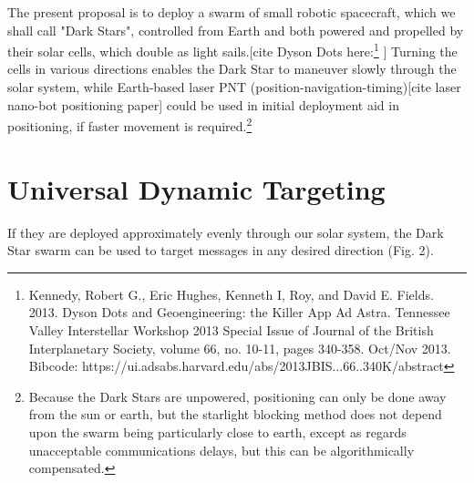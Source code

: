 \documentclass{article}
\begin{document}
The present proposal is to deploy a swarm of small robotic spacecraft, which we shall call "Dark Stars", controlled from Earth and both powered and propelled by their solar cells, which double as light sails.[cite Dyson Dots here:\footnote{Kennedy, Robert G., Eric Hughes, Kenneth I, Roy, and David E. Fields. 2013. Dyson Dots and Geoengineering: the Killer App Ad Astra. Tennessee Valley Interstellar Workshop 2013 Special Issue of Journal of the British Interplanetary Society, volume 66, no. 10-11, pages 340-358. Oct/Nov 2013.  Bibcode: https://ui.adsabs.harvard.edu/abs/2013JBIS...66..340K/abstract} ]  Turning the cells in various directions enables the Dark Star to maneuver slowly through the solar system, while Earth-based laser PNT (position-navigation-timing)[cite laser nano-bot positioning paper] could be used in initial deployment aid in positioning, if faster movement is required.\footnote{Because the Dark Stars are unpowered, positioning can only be done away from the sun or earth, but the starlight blocking method does not depend upon the swarm being particularly close to earth, except as regards unacceptable communications delays, but this can be algorithmically compensated.}  

\section{Universal Dynamic Targeting}

If they are deployed approximately evenly through our solar system, the Dark Star swarm can be used to target messages in any desired direction (Fig. 2).

\begin{figure}
    \centering
    \caption{}
    \label{fig:1_centauri_system}
\end{figure}
\end{document}
